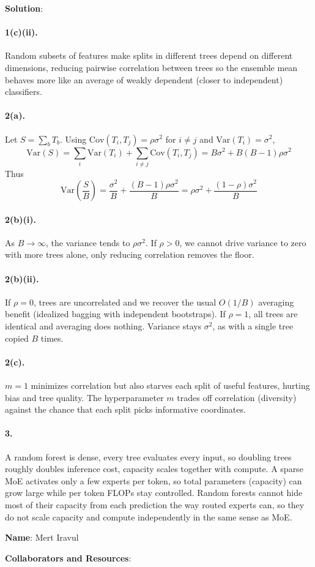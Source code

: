 \documentclass[submit]{../harvardml}
\newenvironment{solution}{
    \vspace{2mm}
    \color{blue}\noindent\textbf{Solution}:
}{}
\begin{document}
\begin{solution}
\paragraph{1(c)(ii).}
Random subsets of features make splits in different trees depend on different dimensions, reducing pairwise correlation between trees so the ensemble mean behaves more like an average of weakly dependent (closer to independent) classifiers.

\paragraph{2(a).}
Let $S = \sum_b T_b$. Using $\mathrm{Cov}(T_i, T_j) = \rho \sigma^2$ for $i \neq j$ and $\mathrm{Var}(T_i) = \sigma^2$,
\[
  \mathrm{Var}(S) = \sum_i \mathrm{Var}(T_i) + \sum_{i \neq j} \mathrm{Cov}(T_i, T_j)
  = B\sigma^2 + B(B-1)\rho\sigma^2
\]
Thus
\[
  \mathrm{Var}\!\left(\frac{S}{B}\right)
  = \frac{\sigma^2}{B} + \frac{(B-1)\rho\sigma^2}{B}
  = \rho\sigma^2 + \frac{(1-\rho)\sigma^2}{B}
\]

\paragraph{2(b)(i).}
As $B \to \infty$, the variance tends to $\rho\sigma^2$. If $\rho > 0$, we cannot drive variance to zero with more trees alone, only reducing correlation removes the floor.

\paragraph{2(b)(ii).}
If $\rho = 0$, trees are uncorrelated and we recover the usual $O(1/B)$ averaging benefit (idealized bagging with independent bootstraps). If $\rho = 1$, all trees are identical and averaging does nothing. Variance stays $\sigma^2$, as with a single tree copied $B$ times.

\paragraph{2(c).}
$m = 1$ minimizes correlation but also starves each split of useful features, hurting bias and tree quality. The hyperparameter $m$ trades off correlation (diversity) against the chance that each split picks informative coordinates.

\paragraph{3.}
A random forest is dense, every tree evaluates every input, so doubling trees roughly doubles inference cost, capacity scales together with compute. A sparse MoE activates only a few experts per token, so total parameters (capacity) can grow large while per token FLOPs stay controlled. Random forests cannot hide most of their capacity from each prediction the way routed experts can, so they do not scale capacity and compute independently in the same sense as MoE.

\end{solution}


\newpage 




\textbf{Name}: Mert Iravul

\textbf{Collaborators and Resources}: 
\end{document}
